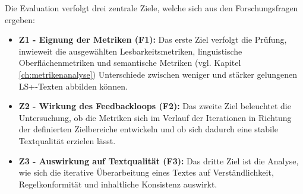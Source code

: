
Die Evaluation verfolgt drei zentrale Ziele, welche sich aus den Forschungsfragen ergeben:
\begin{itemize}
	\item \textbf{Z1 - Eignung der Metriken (F1):} Das erste Ziel verfolgt die Prüfung, inwieweit die ausgewählten Lesbarkeitsmetriken, linguistische Oberflächenmetriken und semantische Metriken (vgl. Kapitel \ref{ch:metrikenanalyse}) Unterschiede zwischen weniger und stärker gelungenen LS+-Texten abbilden können.
	\item \textbf{Z2 - Wirkung des Feedbackloops (F2):} Das zweite Ziel beleuchtet die Untersuchung, ob die Metriken sich im Verlauf der Iterationen in Richtung der definierten Zielbereiche entwickeln und ob sich dadurch eine stabile Textqualität erzielen lässt.
	\item \textbf{Z3 - Auswirkung auf Textqualität (F3):} Das dritte Ziel ist die Analyse, wie sich die iterative Überarbeitung eines Textes auf Verständlichkeit, Regelkonformität und inhaltliche Konsistenz auswirkt.
\end{itemize}